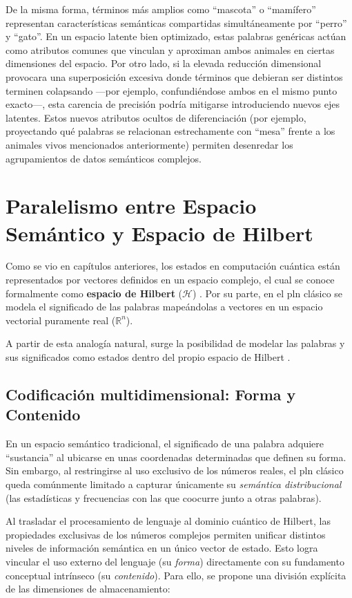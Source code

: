 De la misma forma, términos más amplios como ``mascota'' o ``mamífero'' representan características semánticas compartidas simultáneamente por ``perro'' y ``gato''. En un espacio latente bien optimizado, estas palabras genéricas actúan como atributos comunes que vinculan y aproximan ambos animales en ciertas dimensiones del espacio. Por otro lado, si la elevada reducción dimensional provocara una superposición excesiva donde términos que debieran ser distintos terminen colapsando —por ejemplo, confundiéndose ambos en el mismo punto exacto—, esta carencia de precisión podría mitigarse introduciendo nuevos ejes latentes. Estos nuevos atributos ocultos de diferenciación (por ejemplo, proyectando qué palabras se relacionan estrechamente con ``mesa'' frente a los animales vivos mencionados anteriormente) permiten desenredar los agrupamientos de datos semánticos complejos.


\section{Paralelismo entre Espacio Semántico y Espacio de Hilbert}

Como se vio en capítulos anteriores, los estados en computación cuántica están representados por vectores definidos en un espacio complejo, el cual se conoce formalmente como \textbf{espacio de Hilbert} ($\mathcal{H}$) \cite{quandela_hilbert_space}. Por su parte, en el \gls{pln} clásico se modela el significado de las palabras mapeándolas a vectores en un espacio vectorial puramente real ($\mathbb{R}^n$).

A partir de esta analogía natural, surge la posibilidad de modelar las palabras y sus significados como estados dentro del propio espacio de Hilbert \cite{wittek_combining_semantics}.

\subsection{Codificación multidimensional: Forma y Contenido}

En un espacio semántico tradicional, el significado de una palabra adquiere ``sustancia'' al ubicarse en unas coordenadas determinadas que definen su forma. Sin embargo, al restringirse al uso exclusivo de los números reales, el \gls{pln} clásico queda comúnmente limitado a capturar únicamente su \textit{semántica distribucional} (las estadísticas y frecuencias con las que coocurre junto a otras palabras).

Al trasladar el procesamiento de lenguaje al dominio cuántico de Hilbert, las propiedades exclusivas de los números complejos permiten unificar distintos niveles de información semántica en un único vector de estado. Esto logra vincular el uso externo del lenguaje (su \textit{forma}) directamente con su fundamento conceptual intrínseco (su \textit{contenido}). Para ello, se propone una división explícita de las dimensiones de almacenamiento:


